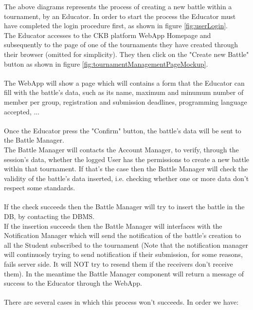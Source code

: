 \documentclass{article}
\begin{document}
{        The above diagrams represents the process of creating a new battle within a tournament,
        by an Educator. In order to start the process the Educator must have completed the login 
        procedure first, as shown in figure \ref{fig:userLogin}. \\
        The Educator accesses to the CKB platform WebApp Homepage and subsequently
        to the page of one of the tournaments they have created through their browser
        (omitted for simplicity).
        They then click on the "Create new Battle" button as shown in figure \ref{fig:tournamentManagementPageMockup}.
        \\ \\
        The WebApp will show a page which will contains a form that the Educator can fill with
        the battle's data, such as its name, maximum and minumum number of member per group,
        registration and submission deadlines, programming language accepted, ... 
        \\ \\
        Once the Educator press the "Confirm" button,
        the battle's data will be sent to the Battle Manager. \\
        The Battle Manager will contacts the Account Manager, to verify, through the session's 
        data, whether the logged User has the permissions to create a new battle within that 
        tournament. 
        If that's the case then the Battle Manager will check the validity of the battle's data 
        inserted, i.e. checking whether one or more data don't respect some standards.
        \\ \\
        If the check succeeds then the Battle Manager will try to insert the battle in the DB,
        by contacting the DBMS. \\
        If the insertion succeeds then the Battle Manager will interfaces with the Notification
        Manager which will send the notification of the battle's creation to all the Student
        subscribed to the tournament (Note that the notification manager will continuosly trying 
        to send notification if their submission, for some reasons, fails server side. It will 
        NOT try to resend them if the receivers don't receive them). 
        In the meantime the Battle Manager component will return a message of success to 
        the Educator through the WebApp.
        \\ \\
        There are several cases in which this process won't succeeds. In order we have:
}
\end{document}
